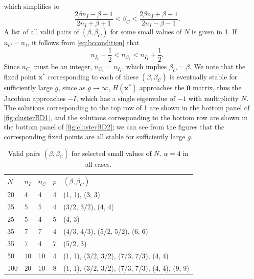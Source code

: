 \documentclass[reqno]{siamonline190516}
\newcommand{\xvec}{\mathbf{x}}
\newcommand{\Zerovec}{\mathbf{0}}
\begin{document}
which simplifies to 
\begin{equation}\label{eq:bccondition}
    \frac{2 \beta n_I - \beta - 1}{2 n_I + \beta + 1} < \beta_C < \frac{2 \beta n_I + \beta + 1}{2 n_I - \beta - 1}.
\end{equation}
A list of all valid pairs of $(\beta, \beta_C)$ for some small values of $N$ is given in \cref{table:validbeta}. If $n_C = n_I$, it follows from \cref{eq:bccondition} that 
\[
n_{I_1} - \frac{1}{2} < n_{C_1} < n_{I_1} + \frac{1}{2}.
\]
Since $n_{C_1}$ must be an integer, $n_{C_1} = n_{I_1}$, which implies $\beta_C = \beta$. We note that the fixed point $\xvec^*$ corresponding to each of these $(\beta, \beta_C)$ is eventually stable for sufficiently large $g$, since as $g\rightarrow \infty$, $H(\xvec^*)$ approaches the $\Zerovec$ matrix, thus the Jacobian approaches $-I$, which has a single eigenvalue of $-1$ with multiplicity $N$. The solutions corresponding to the top row of \cref{table:validbeta} are shown in the bottom panel of \cref{fig:clusterBD1}, and the solutions corresponding to the bottom row are shown in the bottom panel of \cref{fig:clusterBD2}; we can see from the figures that the corresponding fixed points are all stable for sufficiently large $g$.

\begin{table}
\centering
    \begin{tabular}{lllll}
        \toprule
        $N$ & $n_I$ & $n_C$ & $p$ & $(\beta, \beta_C)$ \\
        \midrule
        20 & 4 & 4 & 4 & (1, 1), (3, 3) \\
        25 & 5 & 5 & 4 & (3/2, 3/2), (4, 4) \\
        25 & 5 & 4 & 5 & (4, 3) \\
        35 & 7 & 7 & 4 & (4/3, 4/3), (5/2, 5/2), (6, 6) \\
        35 & 7 & 4 & 7 & (5/2, 3) \\
        50 & 10 & 10 & 4 & (1, 1), (3/2, 3/2), (7/3, 7/3), (4, 4) \\
        100 & 20 & 10 & 8 & (1, 1), (3/2, 3/2), (7/3, 7/3), (4, 4), (9, 9) \\
        \bottomrule
    \end{tabular}
    \vspace{0.25cm}
    \caption{Valid pairs $(\beta, \beta_C)$ for selected small values of $N$. $\alpha = 4$ in all cases.}
    \label{table:validbeta}
\end{table}
\end{document}
